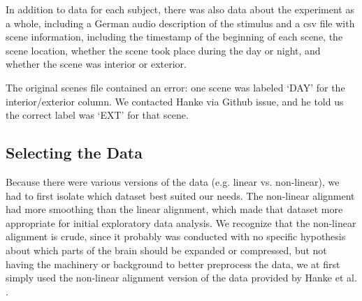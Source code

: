 \documentclass[11pt]{article}
\begin{document}
In addition to data for each subject, there was also data about the
experiment as a whole, including a German audio description of the stimulus
and a csv file with scene information, including the timestamp of the
beginning of each scene, the scene location, whether the scene took place
during the day or night, and whether the scene was interior or exterior.  

The original scenes file contained an error: one scene was labeled `DAY' for 
the interior/exterior column.  We contacted Hanke via Github issue, and he told us the correct 
label was `EXT' for that scene.  

\subsection{Selecting the Data}
Because there were various versions of the
data (e.g. linear vs. non-linear), we had to first isolate which dataset best
suited our needs. The non-linear alignment had more smoothing than the linear
alignment, which made that dataset more appropriate for initial exploratory
data analysis.  We recognize that the non-linear alignment is crude, since it
probably was conducted with no specific hypothesis about which parts of the
brain should be expanded or compressed, but not having the machinery or
background to better preprocess the data, we at first simply used the non-linear
alignment version of the data provided by Hanke et al.
\cite{hank2014audiomovie}.
\end{document}
